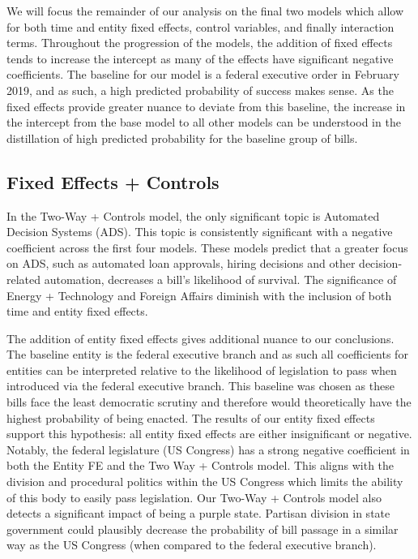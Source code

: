 \documentclass{article}
\begin{document}
We will focus the remainder of our analysis on the final two models which allow for both time and entity fixed effects, control variables, and finally interaction terms. Throughout the progression of the models, the addition of fixed effects tends to increase the intercept as many of the effects have significant negative coefficients. The baseline for our model is a federal executive order in February 2019, and as such, a high predicted probability of success makes sense. As the fixed effects provide greater nuance to deviate from this baseline, the increase in the intercept from the base model to all other models can be understood in the distillation of high predicted probability for the baseline group of bills.

\subsection{Fixed Effects + Controls}

In the Two-Way + Controls model, the only significant topic is Automated Decision Systems (ADS). This topic is consistently significant with a negative coefficient across the first four models. These models predict that a greater focus on ADS, such as automated loan approvals, hiring decisions and other decision-related automation, decreases a bill's likelihood of survival. The significance of Energy + Technology and Foreign Affairs diminish with the inclusion of both time and entity fixed effects. 

The addition of entity fixed effects gives additional nuance to our conclusions. The baseline entity is the federal executive branch and as such all coefficients for entities can be interpreted relative to the likelihood of legislation to pass when introduced via the federal executive branch. This baseline was chosen as these bills face the least democratic scrutiny and therefore would theoretically have the highest probability of being enacted. The results of our entity fixed effects support this hypothesis: all entity fixed effects are either insignificant or negative. Notably, the federal legislature (US Congress) has a strong negative coefficient in both the Entity FE and the Two Way + Controls model. This aligns with the division and procedural politics within the US Congress which limits the ability of this body to easily pass legislation. Our Two-Way + Controls model also detects a significant impact of being a purple state. Partisan division in state government could plausibly decrease the probability of bill passage in a similar way as the US Congress (when compared to the federal executive branch). 
\end{document}
